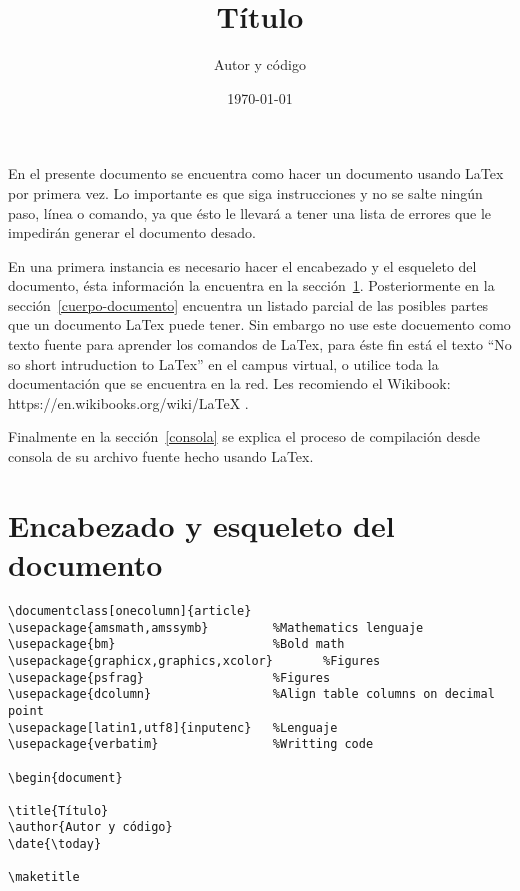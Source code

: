 \documentclass[onecolumn]{article}
\begin{document}
\title{Título}
\author{Autor y código}
\date{\today}

\maketitle

En el presente documento se encuentra como hacer un documento usando LaTex por primera vez. Lo importante es que siga instrucciones y no se salte ningún paso, línea o comando, ya que ésto le llevará a tener una lista de errores que le impedirán generar el documento desado.

En una primera instancia es necesario hacer el encabezado y el esqueleto del documento, ésta información la encuentra en la sección~\ref{encabezado}. Posteriormente en la sección~\ref{cuerpo-documento} encuentra un listado parcial de las posibles partes que un documento LaTex puede tener. Sin embargo no use este docuemento como texto fuente para aprender los comandos de LaTex, para éste fin está el texto ``No so short intruduction to LaTex'' en el campus virtual, o utilice toda la documentación que se encuentra en la red. Les recomiendo el Wikibook:\\
https://en.wikibooks.org/wiki/LaTeX .

Finalmente en la sección~\ref{consola} se explica el proceso de compilación desde consola de su archivo fuente hecho usando LaTex.

\section{Encabezado y esqueleto del documento}\label{encabezado}
\begin{verbatim}
\documentclass[onecolumn]{article}
\usepackage{amsmath,amssymb}         %Mathematics lenguaje
\usepackage{bm}                      %Bold math
\usepackage{graphicx,graphics,xcolor}       %Figures
\usepackage{psfrag}                  %Figures    
\usepackage{dcolumn}                 %Align table columns on decimal point
\usepackage[latin1,utf8]{inputenc}   %Lenguaje
\usepackage{verbatim}                %Writting code 

\begin{document}

\title{Título}
\author{Autor y código}
\date{\today}

\maketitle

\end{verbatim}
\end{document}
